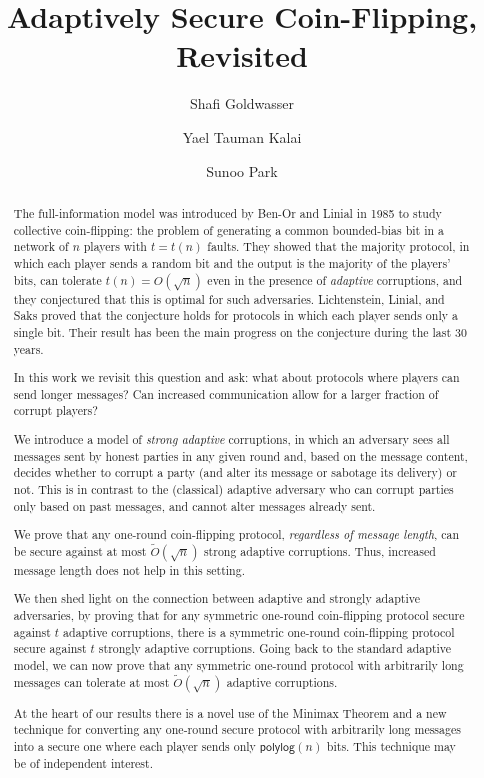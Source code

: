 \documentclass[11pt,letterpaper]{article}
\theoremstyle{plain}
\theoremstyle{definition}
\newcommand{\polylog}{\mathsf{polylog}}
\begin{document}
\title{Adaptively Secure Coin-Flipping, Revisited}

\author[1]{Shafi Goldwasser}
\author[2]{Yael Tauman Kalai}
\author[3]{Sunoo Park}

\date{}
\maketitle

\begin{abstract}
The full-information model was introduced by Ben-Or and Linial in 1985 to study collective coin-flipping: the problem of generating a common bounded-bias bit in a network of $n$ players with $t=t(n)$ faults. They showed that the majority protocol, in which each player sends a random bit and the output is the majority of the players' bits, can tolerate $t(n)=O (\sqrt n)$ even in the presence of \emph{adaptive} corruptions, and they conjectured  that this is optimal for such adversaries. Lichtenstein, Linial, and Saks proved that the conjecture holds for protocols in which each player sends only a single bit. Their result has been the main progress on the conjecture during the last 30 years.

In this work we revisit this question and ask: what about protocols where players can send longer messages? Can increased communication allow for a larger fraction of corrupt players?

We introduce a model of \emph{strong adaptive} corruptions, in which an adversary sees all messages sent by honest parties in any given round and, based on the message content, decides whether to corrupt a party (and alter its message or sabotage its delivery) or not. This is in contrast to the (classical) adaptive adversary who can corrupt parties only based on past messages, and cannot alter messages already sent. 

We prove that any one-round coin-flipping protocol, \emph{regardless of message length}, can be secure against at most $\widetilde{O}(\sqrt n)$ strong adaptive corruptions. Thus, increased message length does not help in this setting.

We then shed light on the connection between adaptive and strongly adaptive adversaries, by proving that for any symmetric one-round coin-flipping protocol secure against $t$ adaptive corruptions, there is a symmetric one-round coin-flipping protocol secure against $t$ strongly adaptive corruptions. Going back to the standard adaptive model, we can now prove that any symmetric one-round protocol with arbitrarily long messages can tolerate at most $\widetilde{O}(\sqrt n)$ adaptive corruptions. 

At the heart of our results there is a novel use of the Minimax Theorem and a new technique for converting any one-round secure protocol  with arbitrarily long messages into a secure one where each player sends only  $\polylog(n)$ bits. This technique may be of independent interest. \end{abstract}
\end{document}
